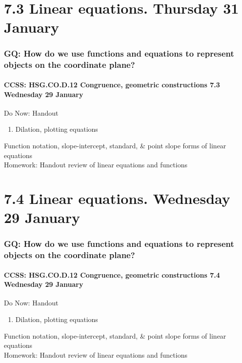 \documentclass{beamer}
\begin{document}
\section{7.3 Linear equations. Thursday 31 January}
  \frame
  {
    \frametitle{GQ: How do we use functions and equations to represent objects on the coordinate plane?}
    \framesubtitle{CCSS: HSG.CO.D.12 Congruence, geometric constructions  \alert{7.3 Wednesday 29 January}}

    \begin{block}{Do Now: Handout}
      \begin{enumerate}
        \item Dilation, plotting equations
      \end{enumerate}
    \end{block}
    Function notation, slope-intercept, standard, \& point slope forms of linear equations\\[0.5cm]
    Homework: Handout review of linear equations and functions
  }


\section{7.4 Linear equations. Wednesday 29 January}
  \frame
  {
    \frametitle{GQ: How do we use functions and equations to represent objects on the coordinate plane?}
    \framesubtitle{CCSS: HSG.CO.D.12 Congruence, geometric constructions  \alert{7.4 Wednesday 29 January}}

    \begin{block}{Do Now: Handout}
      \begin{enumerate}
        \item Dilation, plotting equations
      \end{enumerate}
    \end{block}
    Function notation, slope-intercept, standard, \& point slope forms of linear equations\\[0.5cm]
    Homework: Handout review of linear equations and functions
  }
\end{document}
